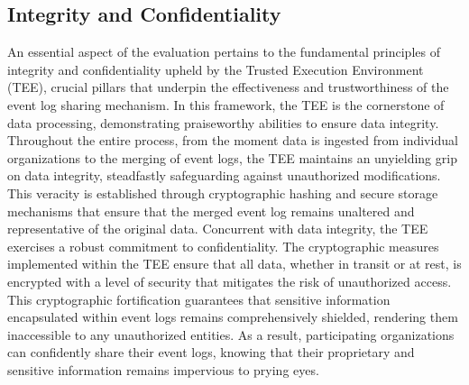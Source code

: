 \subsection{Integrity and Confidentiality}
An essential aspect of the evaluation pertains to the fundamental principles of integrity and confidentiality upheld by the Trusted Execution Environment (TEE), crucial pillars that underpin the effectiveness and trustworthiness of the event log sharing mechanism. In this framework, the TEE is the cornerstone of data processing, demonstrating praiseworthy abilities to ensure data integrity. Throughout the entire process, from the moment data is ingested from individual organizations to the merging of event logs, the TEE maintains an unyielding grip on data integrity, steadfastly safeguarding against unauthorized modifications. This veracity is established through cryptographic hashing and secure storage mechanisms that ensure that the merged event log remains unaltered and representative of the original data. Concurrent with data integrity, the TEE exercises a robust commitment to confidentiality. The cryptographic measures implemented within the TEE ensure that all data, whether in transit or at rest, is encrypted with a level of security that mitigates the risk of unauthorized access. This cryptographic fortification guarantees that sensitive information encapsulated within event logs remains comprehensively shielded, rendering them inaccessible to any unauthorized entities. As a result, participating organizations can confidently share their event logs, knowing that their proprietary and sensitive information remains impervious to prying eyes.

